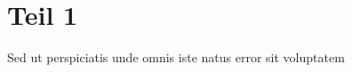 %
%
%
%
\section{Teil 1
\label{openfoam:section:teil1}}
Sed ut perspiciatis unde omnis iste natus error sit voluptatem
